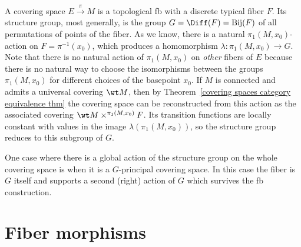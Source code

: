 \begin{example}
    A covering space $E\overset{\pi}{\to} M$ is a topological \gls{fb} with a discrete typical fiber $F$. Its structure group, most generally, is the group $G=\Diff(F)=\mathrm{Bij}(F)$ of all permutations of points of the fiber. As we know, there is a natural $\pi_1(M,x_0)$-action on $F=\pi^{-1}(x_0)$, which produces a homomorphism $\lambda:\pi_1(M,x_0)\to G$. Note that there is no natural action of $\pi_1(M,x_0)$ on \emph{other} fibers of $E$ because there is no natural way to choose the isomorphisms between the groups $\pi_1(M,x_0)$ for different choices of the basepoint $x_0$. If $M$ is connected and admits a universal covering $\wt M$, then by Theorem~\ref{covering spaces category equivalence thm} the covering space can be reconstructed from this action as the associated covering $\wt M\times^{\pi_1(M,x_0)}F$. Its transition functions are locally constant with values in the image $\lambda(\pi_1(M,x_0))$, so the structure group reduces to this subgroup of $G$. 
    
    One case where there is a global action of the structure group on the whole covering space is when it is a $G$-principal covering space. In this case the fiber is $G$ itself and supports a second (right) action of $G$ which survives the \gls{fb} construction.
\end{example}






\section{Fiber morphisms}\label{sec: fiber morphisms}

